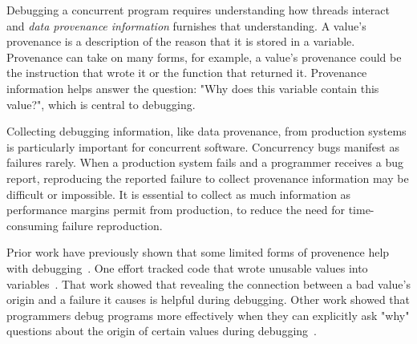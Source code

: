 \documentclass[preprint,9pt]{sigplanconf}
\begin{document}

Debugging a concurrent program requires understanding how threads interact and
{\em data provenance information} furnishes that understanding. A value's
provenance is a description of the reason that it is stored in a variable.
Provenance can take on many forms, for example, a value's provenance could be
the instruction that wrote it or the function that returned it.  Provenance
information helps answer the question: "Why does this variable contain this
value?", which is central to debugging.  


Collecting debugging information, like data provenance, from production systems
is particularly important for concurrent software.  Concurrency bugs manifest
as failures rarely.  When a production system fails and a programmer receives a
bug report, reproducing the reported failure to collect provenance information
may be difficult or impossible.  It is essential to collect as much information
as performance margins permit from production, to reduce the need for
time-consuming failure reproduction.


Prior work have previously shown that some limited forms of provenence help
with debugging~\cite{badapples, whylineicse, tipslicingsurvey}.  One effort
tracked code that wrote unusable values into variables~\cite{badapples}.  That
work showed that revealing the connection between a bad value's origin and a
failure it causes is helpful during debugging.  Other work showed that
programmers debug programs more effectively when they can explicitly ask "why"
questions about the origin of certain values during
debugging~\cite{tipslicingsurvey,whylineicse}.
\end{document}

